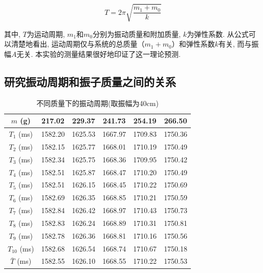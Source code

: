 \documentclass[zihao=5, UTF8]{article}
\theoremstyle{MyLineTheoremStyle} %
\theoremstyle{MyBlockTheoremStyle} %
\theoremstyle{MySubsubsectionStyle} %
\begin{document}
\begin{equation}
T = 2\pi\sqrt{\frac{m_1 + m_0}{k}}
\end{equation}

其中, $T$为运动周期, $m_1$和$m_0$分别为振动质量和附加质量, $k$为弹性系数. 从公式可以清楚地看出, 运动周期仅与系统的总质量（$m_1 + m_0$）和弹性系数$k$有关, 而与振幅$A$无关. 本实验的测量结果很好地印证了这一理论预测. 

\subsection{研究振动周期和振子质量之间的关系}

\begin{table}[H]
\centering
\begin{tabular}{|c|c|c|c|c|c|} 
\hline
$m$ (\si{\gram})   & 217.02  & 229.37  & 241.73  & 254.19  & 266.50   \\ 
\hline
$T_1$ (\si{\milli\second})    & 1582.20 & 1625.53 & 1667.97 & 1709.83 & 1750.36  \\ 
\hline
$T_2$ (\si{\milli\second})    & 1582.15 & 1625.77 & 1668.01 & 1710.19 & 1750.49  \\ 
\hline
$T_3$ (\si{\milli\second})    & 1582.34 & 1625.75 & 1668.36 & 1709.95 & 1750.42  \\ 
\hline
$T_4$ (\si{\milli\second})    & 1582.51 & 1625.87 & 1668.47 & 1710.20 & 1750.49  \\ 
\hline
$T_5$ (\si{\milli\second})    & 1582.51 & 1626.15 & 1668.45 & 1710.22 & 1750.69  \\ 
\hline
$T_6$ (\si{\milli\second})    & 1582.69 & 1626.35 & 1668.85 & 1710.21 & 1750.59  \\ 
\hline
$T_7$ (\si{\milli\second})    & 1582.84 & 1626.42 & 1668.97 & 1710.43 & 1750.73  \\ 
\hline
$T_8$ (\si{\milli\second})    & 1582.83 & 1626.24 & 1668.89 & 1710.31 & 1750.81  \\ 
\hline
$T_9$ (\si{\milli\second})    & 1582.78 & 1626.36 & 1668.81 & 1710.16 & 1750.56  \\ 
\hline
$T_{10}$ (\si{\milli\second})    & 1582.68 & 1626.54 & 1668.74 & 1710.67 & 1750.18  \\ 
\hline
$\bar{T}$ (\si{\milli\second}) & 1582.55 & 1626.10 & 1668.55 & 1710.22 & 1750.53  \\
\hline
\end{tabular}
\caption{不同质量下的振动周期(取振幅为40cm)}
\label{tab:T-m}
\end{table}
\end{document}
